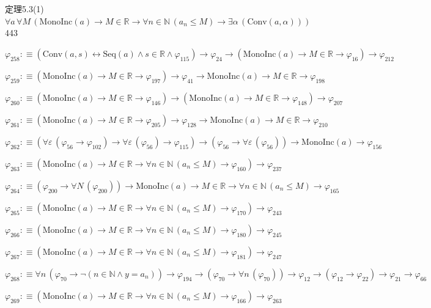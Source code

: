 \begin{fullproof}{定理5.3(1)}{$\forall a\,\forall M\,(\mathrm{MonoInc}(a) \to M \in \mathbb{R} \to \forall n \in \mathbb{N}\,(a_{n} \leq M) \to \exists \alpha\,(\mathrm{Conv}(a,\alpha)))$}{443}
\begin{abbrevlist}
\item $\varphi_{258} :\equiv (\mathrm{Conv}(a,s) \leftrightarrow \mathrm{Seq}(a) \land s \in \mathbb{R} \land \varphi_{115}) \to \varphi_{24} \to (\mathrm{MonoInc}(a) \to M \in \mathbb{R} \to \varphi_{16}) \to \varphi_{212}$
\item $\varphi_{259} :\equiv (\mathrm{MonoInc}(a) \to M \in \mathbb{R} \to \varphi_{197}) \to \varphi_{41} \to \mathrm{MonoInc}(a) \to M \in \mathbb{R} \to \varphi_{198}$
\item $\varphi_{260} :\equiv (\mathrm{MonoInc}(a) \to M \in \mathbb{R} \to \varphi_{146}) \to (\mathrm{MonoInc}(a) \to M \in \mathbb{R} \to \varphi_{148}) \to \varphi_{207}$
\item $\varphi_{261} :\equiv (\mathrm{MonoInc}(a) \to M \in \mathbb{R} \to \varphi_{205}) \to \varphi_{128} \to \mathrm{MonoInc}(a) \to M \in \mathbb{R} \to \varphi_{210}$
\item $\varphi_{262} :\equiv (\forall \varepsilon\,(\varphi_{56} \to \varphi_{102}) \to \forall \varepsilon\,(\varphi_{56}) \to \varphi_{115}) \to (\varphi_{56} \to \forall \varepsilon\,(\varphi_{56})) \to \mathrm{MonoInc}(a) \to \varphi_{156}$
\item $\varphi_{263} :\equiv (\mathrm{MonoInc}(a) \to M \in \mathbb{R} \to \forall n \in \mathbb{N}\,(a_{n} \leq M) \to \varphi_{160}) \to \varphi_{237}$
\item $\varphi_{264} :\equiv (\varphi_{200} \to \forall N\,(\varphi_{200})) \to \mathrm{MonoInc}(a) \to M \in \mathbb{R} \to \forall n \in \mathbb{N}\,(a_{n} \leq M) \to \varphi_{165}$
\item $\varphi_{265} :\equiv (\mathrm{MonoInc}(a) \to M \in \mathbb{R} \to \forall n \in \mathbb{N}\,(a_{n} \leq M) \to \varphi_{170}) \to \varphi_{243}$
\item $\varphi_{266} :\equiv (\mathrm{MonoInc}(a) \to M \in \mathbb{R} \to \forall n \in \mathbb{N}\,(a_{n} \leq M) \to \varphi_{180}) \to \varphi_{245}$
\item $\varphi_{267} :\equiv (\mathrm{MonoInc}(a) \to M \in \mathbb{R} \to \forall n \in \mathbb{N}\,(a_{n} \leq M) \to \varphi_{181}) \to \varphi_{247}$
\item $\varphi_{268} :\equiv \forall n\,(\varphi_{70} \to \neg (n \in \mathbb{N} \land y = a_{n})) \to \varphi_{194} \to (\varphi_{70} \to \forall n\,(\varphi_{70})) \to \varphi_{12} \to (\varphi_{12} \to \varphi_{22}) \to \varphi_{21} \to \varphi_{66}$
\item $\varphi_{269} :\equiv (\mathrm{MonoInc}(a) \to M \in \mathbb{R} \to \forall n \in \mathbb{N}\,(a_{n} \leq M) \to \varphi_{166}) \to \varphi_{263}$

\end{abbrevlist}
\end{fullproof}

